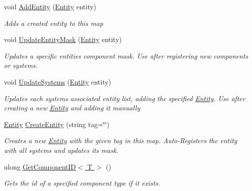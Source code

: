\begin{DoxyCompactItemize}
void \hyperlink{class_m_b2_d_1_1_entity_component_1_1_entity_map_a0800ef900f92c04902d5b1c355aab900}{Add\+Entity} (\hyperlink{class_m_b2_d_1_1_entity_component_1_1_entity}{Entity} entity)
\begin{DoxyCompactList}\small\item\em Adds a created entity to this map \end{DoxyCompactList}\item 
void \hyperlink{class_m_b2_d_1_1_entity_component_1_1_entity_map_a968ce46cbba14cdc7814dd308f133949}{Update\+Entity\+Mask} (\hyperlink{class_m_b2_d_1_1_entity_component_1_1_entity}{Entity} entity)
\begin{DoxyCompactList}\small\item\em Updates a specific entities component mask. Use after registering new components or systems. \end{DoxyCompactList}\item 
void \hyperlink{class_m_b2_d_1_1_entity_component_1_1_entity_map_ab6078e0b6eddb220b9bbf5d358d6e365}{Update\+Systems} (\hyperlink{class_m_b2_d_1_1_entity_component_1_1_entity}{Entity} entity)
\begin{DoxyCompactList}\small\item\em Updates each systems associated entity list, adding the specified \hyperlink{class_m_b2_d_1_1_entity_component_1_1_entity}{Entity}. Use after creating a new \hyperlink{class_m_b2_d_1_1_entity_component_1_1_entity}{Entity} and adding it manually \end{DoxyCompactList}\item 
\hyperlink{class_m_b2_d_1_1_entity_component_1_1_entity}{Entity} \hyperlink{class_m_b2_d_1_1_entity_component_1_1_entity_map_a2461bfeb368018daadb2578c445f8fc2}{Create\+Entity} (string tag=\char`\"{}\char`\"{})
\begin{DoxyCompactList}\small\item\em Creates a new \hyperlink{class_m_b2_d_1_1_entity_component_1_1_entity}{Entity} with the given tag in this map. Auto-\/\+Registers the entity with all systems and updates its mask. \end{DoxyCompactList}\item 
ulong \hyperlink{class_m_b2_d_1_1_entity_component_1_1_entity_map_ad0a7991327281d908b72b33bc1944b70}{Get\+Component\+I\+D$<$ T $>$} ()
\begin{DoxyCompactList}\small\item\em Gets the id of a specified component type if it exists. \end{DoxyCompactList}\item 

\end{DoxyCompactItemize}
